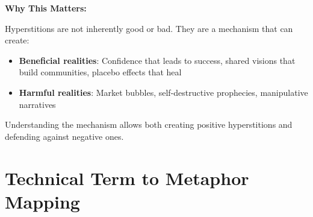 \begin{tcolorbox}[colback=green!5!white,colframe=green!65!black,title=\textbf{Plain English: The Self-Writing Story},breakable]
\textbf{Why This Matters:}

Hyperstitions are not inherently good or bad. They are a mechanism that can create:
\begin{itemize}
    \item \textbf{Beneficial realities}: Confidence that leads to success, shared visions that build communities, placebo effects that heal
    \item \textbf{Harmful realities}: Market bubbles, self-destructive prophecies, manipulative narratives
\end{itemize}
Understanding the mechanism allows both creating positive hyperstitions and defending against negative ones.

\end{tcolorbox}

\section{Technical Term to Metaphor Mapping}
\label{sec:term-mapping}

